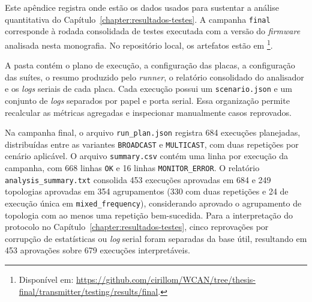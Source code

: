 Este apêndice registra onde estão os dados usados para sustentar a análise
quantitativa do Capítulo~\ref{chapter:resultados-testes}. A campanha
\texttt{final} corresponde à rodada consolidada de testes executada com a versão
do \emph{firmware} analisada nesta monografia. No repositório local, os artefatos estão
em \footnote{Disponível em: \url{https://github.com/cirillom/WCAN/tree/thesis-final/transmitter/testing/results/final}.}.

A pasta contém o plano de execução, a configuração das placas, a configuração das
suítes, o resumo produzido pelo \emph{runner}, o relatório consolidado do analisador e
os \emph{logs} seriais de cada placa. Cada execução possui um \texttt{scenario.json} e
um conjunto de \emph{logs} separados por papel e porta serial. Essa organização permite
recalcular as métricas agregadas e inspecionar manualmente casos reprovados.

Na campanha final, o arquivo \texttt{run\_plan.json} registra 684 execuções
planejadas, distribuídas entre as variantes \texttt{BROADCAST} e
\texttt{MULTICAST}, com duas repetições por cenário aplicável. O arquivo
\texttt{summary.csv} contém uma linha por execução da campanha, com 668 linhas
\texttt{OK} e 16 linhas \texttt{MONITOR\_ERROR}. O relatório
\texttt{analysis\_summary.txt} consolida 453 execuções aprovadas em 684 e 249
topologias aprovadas em 354 agrupamentos (330 com duas repetições e 24 de
execução única em \texttt{mixed\_frequency}), considerando aprovado o agrupamento
de topologia com ao menos uma repetição bem-sucedida. Para a interpretação do
protocolo no
Capítulo~\ref{chapter:resultados-testes}, cinco reprovações por corrupção de
estatísticas ou \emph{log} serial foram separadas da base útil, resultando em 453
aprovações sobre 679 execuções interpretáveis.
